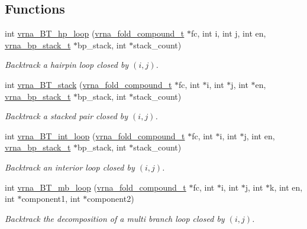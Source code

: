 \subsection*{Functions}
\begin{DoxyCompactItemize}
\item 
int \hyperlink{group__mfe__backtracking_gae20d5805ddedc9b81d24735b11b6a9bf}{vrna\+\_\+\+B\+T\+\_\+hp\+\_\+loop} (\hyperlink{group__fold__compound_ga1b0cef17fd40466cef5968eaeeff6166}{vrna\+\_\+fold\+\_\+compound\+\_\+t} $\ast$fc, int i, int j, int en, \hyperlink{group__data__structures_gaa651bda42e7692f08cb603cd6834b0ee}{vrna\+\_\+bp\+\_\+stack\+\_\+t} $\ast$bp\+\_\+stack, int $\ast$stack\+\_\+count)
\begin{DoxyCompactList}\small\item\em Backtrack a hairpin loop closed by $ (i,j) $. \end{DoxyCompactList}\item 
\mbox{\label{group__mfe__backtracking_ga28015cfbd0afc759b94ff58cc241cb13}} 
int \hyperlink{group__mfe__backtracking_ga28015cfbd0afc759b94ff58cc241cb13}{vrna\+\_\+\+B\+T\+\_\+stack} (\hyperlink{group__fold__compound_ga1b0cef17fd40466cef5968eaeeff6166}{vrna\+\_\+fold\+\_\+compound\+\_\+t} $\ast$fc, int $\ast$i, int $\ast$j, int $\ast$en, \hyperlink{group__data__structures_gaa651bda42e7692f08cb603cd6834b0ee}{vrna\+\_\+bp\+\_\+stack\+\_\+t} $\ast$bp\+\_\+stack, int $\ast$stack\+\_\+count)
\begin{DoxyCompactList}\small\item\em Backtrack a stacked pair closed by $ (i,j) $. \end{DoxyCompactList}\item 
\mbox{\label{group__mfe__backtracking_ga90b5a5723173996fb40640ce7c95c07e}} 
int \hyperlink{group__mfe__backtracking_ga90b5a5723173996fb40640ce7c95c07e}{vrna\+\_\+\+B\+T\+\_\+int\+\_\+loop} (\hyperlink{group__fold__compound_ga1b0cef17fd40466cef5968eaeeff6166}{vrna\+\_\+fold\+\_\+compound\+\_\+t} $\ast$fc, int $\ast$i, int $\ast$j, int en, \hyperlink{group__data__structures_gaa651bda42e7692f08cb603cd6834b0ee}{vrna\+\_\+bp\+\_\+stack\+\_\+t} $\ast$bp\+\_\+stack, int $\ast$stack\+\_\+count)
\begin{DoxyCompactList}\small\item\em Backtrack an interior loop closed by $ (i,j) $. \end{DoxyCompactList}\item 
int \hyperlink{group__mfe__backtracking_ga5b62d56c9d47c1e8792b02cd6b95e78b}{vrna\+\_\+\+B\+T\+\_\+mb\+\_\+loop} (\hyperlink{group__fold__compound_ga1b0cef17fd40466cef5968eaeeff6166}{vrna\+\_\+fold\+\_\+compound\+\_\+t} $\ast$fc, int $\ast$i, int $\ast$j, int $\ast$k, int en, int $\ast$component1, int $\ast$component2)
\begin{DoxyCompactList}\small\item\em Backtrack the decomposition of a multi branch loop closed by $ (i,j) $. \end{DoxyCompactList}\end{DoxyCompactItemize}


